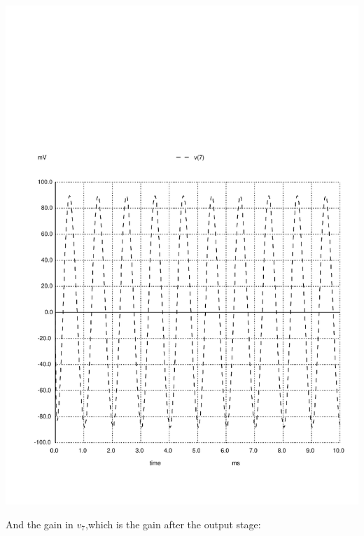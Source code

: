 \includegraphics[width=1\linewidth]{../sim/vo1.pdf}

And the gain in $v_7$,which is the gain after the output stage:

